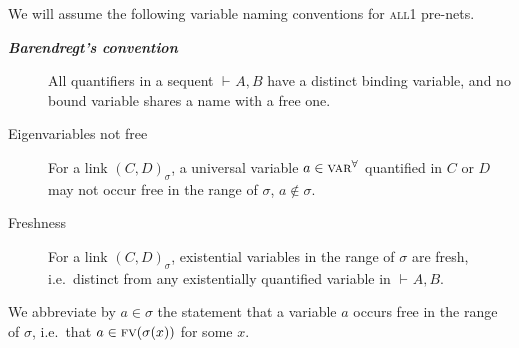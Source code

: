 \documentclass[UKenglish]{lipics-v2016}
\theoremstyle{plain}
\newcommand\defn[1]{\textit{\textbf{#1}}}
\newcommand\varA{\textsc{var}^\forall}
\newcommand\terms{\textsc{term}}
\newcommand\termsA{\textsc{term}^\forall}
\newcommand\all{\textsc{all}}
\newcommand\+{+}
\renewcommand\*{\times}
\newcommand\seq[3][]{{\vdash_{#1}}#2,#3}
\newcommand\fv{\textsc{fv}}
\newcommand\link[3][\sigma]{(#2,#3)_{#1}}
\begin{document}
We will assume the following variable naming conventions for \all1 pre-nets.

\begin{description}
	\item
[\defn{Barendregt's convention}] All quantifiers in a sequent $\seq AB$ have a distinct binding variable, and no bound variable shares a name with a free one.

	\item[Eigenvariables not free]
For a link $\link CD$, a universal variable $a\in\varA$ quantified in $C$ or $D$ may not occur free in the range of $\sigma$, $a\notin\sigma$.

	\item[Freshness]
For a link $\link CD$, existential variables in the range of $\sigma$ are fresh, i.e.\ distinct from any existentially quantified variable in $\seq AB$.
\end{description}


We abbreviate by $a\in \sigma$ the statement that a variable $a$ occurs free in the range of $\sigma$, i.e.\ that $a\in\fv(\sigma(x))$ for some $x$.
\end{document}
